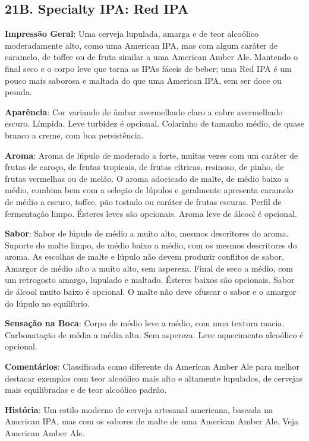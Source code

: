 \subsection*{21B. Specialty IPA: Red IPA}
\textbf{Impressão Geral}: Uma cerveja lupulada, amarga e de teor alcoólico moderadamente alto, como uma American IPA, mas com algum caráter de caramelo, de toffee ou de fruta similar a uma American Amber Ale. Mantendo o final seco e o corpo leve que torna as IPAs fáceis de beber; uma Red IPA é um pouco mais saborosa e maltada do que uma American IPA, sem ser doce ou pesada.

\textbf{Aparência}: Cor variando de âmbar avermelhado claro a cobre avermelhado escuro. Límpida. Leve turbidez é opcional. Colarinho de tamanho médio, de quase branco a creme, com boa persistência.

\textbf{Aroma}: Aroma de lúpulo de moderado a forte, muitas vezes com um caráter de frutas de caroço, de frutas tropicais, de frutas cítricas, resinoso, de pinho, de frutas vermelhas ou de melão. O aroma adocicado de malte, de médio baixo a médio, combina bem com a seleção de lúpulos e geralmente apresenta caramelo de médio a escuro, toffee, pão tostado ou caráter de frutas escuras. Perfil de fermentação limpo. Ésteres leves são opcionais. Aroma leve de álcool é opcional.

\textbf{Sabor}: Sabor de lúpulo de médio a muito alto, mesmos descritores do aroma. Suporte do malte limpo, de médio baixo a médio, com os mesmos descritores do aroma. As escolhas de malte e lúpulo não devem produzir conflitos de sabor. Amargor de médio alto a muito alto, sem aspereza. Final de seco a médio, com um retrogosto amargo, lupulado e maltado. Ésteres baixos são opcionais. Sabor de álcool muito baixo é opcional. O malte não deve ofuscar o sabor e o amargor do lúpulo no equilíbrio.

\textbf{Sensação na Boca}: Corpo de médio leve a médio, com uma textura macia. Carbonatação de média a média alta. Sem aspereza. Leve aquecimento alcoólico é opcional.

\textbf{Comentários}: Classificada como diferente da American Amber Ale para melhor destacar exemplos com teor alcoólico mais alto e altamente lupulados, de cervejas mais equilibradas e de teor alcoólico padrão.

\textbf{História}: Um estilo moderno de cerveja artesanal americana, baseada na American IPA, mas com os sabores de malte de uma American Amber Ale. Veja American Amber Ale.

